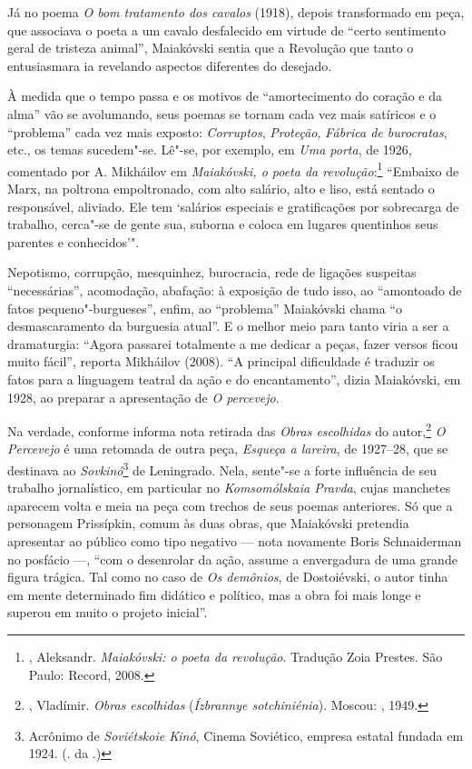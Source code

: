 Já no poema \emph{O bom tratamento dos cavalos} (1918), depois
transformado em peça, que associava o poeta a um cavalo desfalecido em
virtude de ``certo sentimento geral de tristeza animal'', Maiakóvski
sentia que a Revolução que tanto o entusiasmara ia revelando aspectos
diferentes do desejado.

À medida que o tempo passa e os motivos de ``amortecimento do coração e
da alma'' vão se avolumando, seus poemas se tornam cada vez mais
satíricos e o ``problema'' cada vez mais exposto: \emph{Corruptos},
\emph{Proteção}, \emph{Fábrica de burocratas}, etc., os temas
sucedem"-se. Lê"-se, por exemplo, em \emph{Uma porta}, de 1926, comentado
por A. Mikháilov em \emph{Maiakóvski, o poeta da revolução}:\footnote{,
  Aleksandr. \emph{Maiakóvski: o poeta da revolução}. Tradução Zoia
  Prestes. São Paulo: Record, 2008.} ``Embaixo de Marx, na poltrona
empoltronado, com alto salário, alto e liso, está sentado o responsável,
aliviado. Ele tem `salários especiais e gratificações por sobrecarga de
trabalho, cerca"-se de gente sua, suborna e coloca em lugares quentinhos
seus parentes e conhecidos'".

Nepotismo, corrupção, mesquinhez, burocracia, rede de ligações suspeitas
``necessárias'', acomodação, abafação: à exposição de tudo isso, ao
``amontoado de fatos pequeno"-burgueses'', enfim, ao ``problema'' Maiakóvski
chama ``o desmascaramento da burguesia atual''. E o melhor meio para
tanto viria a ser a dramaturgia: ``Agora passarei totalmente a me dedicar
a peças, fazer versos ficou muito fácil'', reporta Mikháilov (2008). ``A
principal dificuldade é traduzir os fatos para a linguagem teatral da
ação e do encantamento'', dizia Maiakóvski, em 1928, ao preparar a
apresentação de \emph{O percevejo}.

Na verdade, conforme informa nota retirada das \emph{Obras escolhidas}
do autor,\footnote{, Vladímir. \emph{Obras escolhidas}
  (\emph{Ízbrannye sotchiniénia}). Moscou: , 1949.} \emph{O
Percevejo} é uma retomada de outra peça, \emph{Esqueça a lareira}, de
1927--28, que se destinava ao \emph{Sovkinó}\footnote{Acrônimo de
  \emph{Soviétskoie Kinó}, Cinema Soviético, empresa estatal fundada em
  1924. (. da .)} de Leningrado. Nela, sente"-se a forte influência de
seu trabalho jornalístico, em particular no \emph{Komsomólskaia Pravda},
cujas manchetes aparecem volta e meia na peça com trechos de seus poemas
anteriores. Só que a personagem Prissípkin, comum às duas obras, que
Maiakóvski pretendia apresentar ao público como tipo negativo --- nota
novamente Boris Schnaiderman no posfácio ---, ``com o desenrolar da ação,
assume a envergadura de uma grande figura trágica. Tal como no caso de
\emph{Os demônios}, de Dostoiévski, o autor tinha em mente determinado
fim didático e político, mas a obra foi mais longe e superou em muito o
projeto inicial''.

